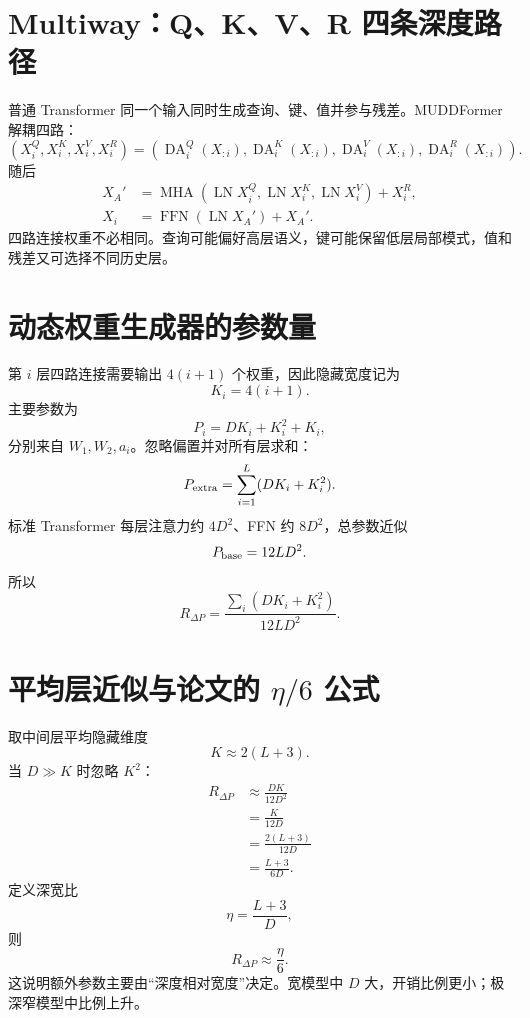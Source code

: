 \documentclass[UTF8,12pt,a4paper,fontset=none]{ctexart}
\numberwithin{equation}{section}
\begin{document}
\section{Multiway：Q、K、V、R 四条深度路径}
普通 Transformer 同一个输入同时生成查询、键、值并参与残差。MUDDFormer 解耦四路：
\begin{equation}
 (X_i^Q,X_i^K,X_i^V,X_i^R)
 =\left(\operatorname{DA}_i^Q(X_{:i}),
 \operatorname{DA}_i^K(X_{:i}),
 \operatorname{DA}_i^V(X_{:i}),
 \operatorname{DA}_i^R(X_{:i})\right).
\end{equation}
随后
\begin{align}
 X_A'&=\operatorname{MHA}(\operatorname{LN}X_i^Q,
 \operatorname{LN}X_i^K,\operatorname{LN}X_i^V)+X_i^R,\\
 X_i&=\operatorname{FFN}(\operatorname{LN}X_A')+X_A'.
\end{align}
四路连接权重不必相同。查询可能偏好高层语义，键可能保留低层局部模式，值和残差又可选择不同历史层。

\section{动态权重生成器的参数量}
第 $i$ 层四路连接需要输出 $4(i+1)$ 个权重，因此隐藏宽度记为
\begin{equation}
 K_i=4(i+1).
\end{equation}
主要参数为
\begin{equation}
 P_i=DK_i+K_i^2+K_i,
\end{equation}
分别来自 $W_1,W_2,a_i$。忽略偏置并对所有层求和：
\begin{equation}
 P_{\rm extra}=\sum_{i=1}^{L}(DK_i+K_i^2).
\end{equation}
标准 Transformer 每层注意力约 $4D^2$、FFN 约 $8D^2$，总参数近似
\begin{equation}
 P_{\rm base}=12LD^2.
\end{equation}
所以
\begin{equation}
 R_{\Delta P}=\frac{\sum_i(DK_i+K_i^2)}{12LD^2}.
\end{equation}

\section{平均层近似与论文的 $\eta/6$ 公式}
取中间层平均隐藏维度
\begin{equation}
 K\approx2(L+3).
\end{equation}
当 $D\gg K$ 时忽略 $K^2$：
\begin{align}
 R_{\Delta P}
 &\approx\frac{DK}{12D^2}\\
 &=\frac{K}{12D}\\
 &=\frac{2(L+3)}{12D}\\
 &=\boxed{\frac{L+3}{6D}}.
\end{align}
定义深宽比
\begin{equation}
 \eta=\frac{L+3}{D},
\end{equation}
则
\begin{equation}
 R_{\Delta P}\approx\frac{\eta}{6}.
\end{equation}
这说明额外参数主要由“深度相对宽度”决定。宽模型中 $D$ 大，开销比例更小；极深窄模型中比例上升。
\end{document}
